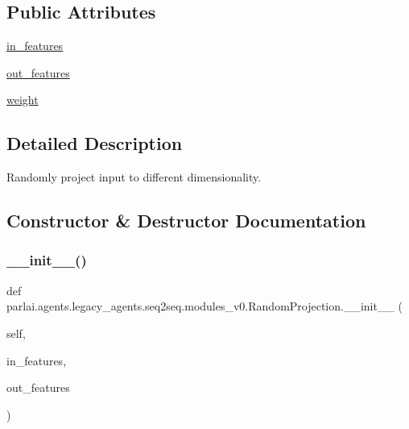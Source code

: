 \subsection*{Public Attributes}
\begin{DoxyCompactItemize}
\item 
\hyperlink{classparlai_1_1agents_1_1legacy__agents_1_1seq2seq_1_1modules__v0_1_1RandomProjection_a746c126e0335761df8b17d83b11827c6}{in\+\_\+features}
\item 
\hyperlink{classparlai_1_1agents_1_1legacy__agents_1_1seq2seq_1_1modules__v0_1_1RandomProjection_a96b2dfcaec3fee60b2874e451474a38c}{out\+\_\+features}
\item 
\hyperlink{classparlai_1_1agents_1_1legacy__agents_1_1seq2seq_1_1modules__v0_1_1RandomProjection_a6564c7d7b6296013fc59706c0c32267e}{weight}
\end{DoxyCompactItemize}


\subsection{Detailed Description}
\begin{DoxyVerb}Randomly project input to different dimensionality.
\end{DoxyVerb}
 

\subsection{Constructor \& Destructor Documentation}
\mbox{\label{classparlai_1_1agents_1_1legacy__agents_1_1seq2seq_1_1modules__v0_1_1RandomProjection_ab509b80358309b000bdd54ff89117ae5}} 
\subsubsection{\texorpdfstring{\+\_\+\+\_\+init\+\_\+\+\_\+()}{\_\_init\_\_()}}
{\footnotesize\ttfamily def parlai.\+agents.\+legacy\+\_\+agents.\+seq2seq.\+modules\+\_\+v0.\+Random\+Projection.\+\_\+\+\_\+init\+\_\+\+\_\+ (\begin{DoxyParamCaption}\item[{}]{self,  }\item[{}]{in\+\_\+features,  }\item[{}]{out\+\_\+features }\end{DoxyParamCaption})}



